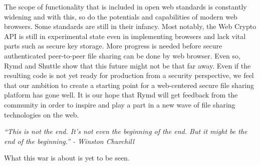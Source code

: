 The scope of functionality that is included in open web standards is constantly widening and with this, so do the potentials and capabilities of modern web browsers. Some standards are still in their infancy. Most notably, the Web Crypto API is still in experimental state even in implementing browsers and lack vital parts such as secure key storage. More progress is needed before secure authenticated peer-to-peer file sharing can be done by web browser. Even so, Rymd and Shuttle show that this future might not be that far away. Even if the resulting code is not yet ready for production from a security perspective, we feel that our ambition to create a starting point for a web-centered secure file sharing platform has gone well. It is our hope that Rymd will get feedback from the community in order to inspire and play a part in a new wave of file sharing technologies on the web.


\emph{``This is not the end. It's not even the beginning of the end. But it might be the end of the beginning.'' - Winston Churchill}

What this war is about is yet to be seen.
